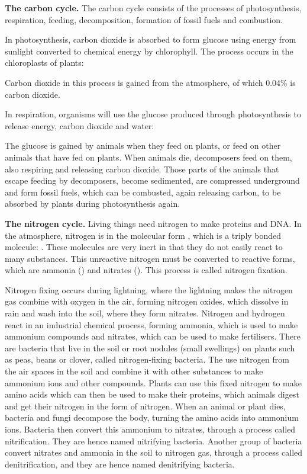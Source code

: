 \textbf{The carbon cycle.} 
The carbon cycle consists of the processes of photosynthesis, respiration, feeding, decomposition,
formation of fossil fuels and combustion.

In photosynthesis, carbon dioxide is absorbed to form glucose using energy from sunlight converted
to chemical energy by chlorophyll. The process occurs in the chloroplasts of plants:

\begin{center}
\end{center}
Carbon dioxide in this process is gained from the atmosphere, of which 0.04\% is carbon dioxide. 

In respiration, organisms will use the glucose produced through photosynthesis to release energy,
carbon dioxide and water:

\begin{center}
\end{center}

The glucose is gained by animals when they feed on plants, or feed on other animals that have fed
on plants. When animals die, decomposers feed on them, also respiring and releasing carbon dioxide.
Those parts of the animals that escape feeding by decomposers, become sedimented, are compressed
underground and form fossil fuels, which can be combusted, again releasing carbon, to be absorbed
by plants during photosynthesis again.

\textbf{The nitrogen cycle.} Living things need nitrogen to make proteins and DNA. In the 
atmosphere, nitrogen is in the molecular form , which is a triply bonded molecule: 
. These molecules are very inert in that they do not easily react to many substances.
This unreactive nitrogen must be converted to reactive forms, which are ammonia () and
nitrates (). This process is called nitrogen fixation.

Nitrogen fixing occurs during lightning, where the lightning makes the nitrogen gas combine with
oxygen in the air, forming nitrogen oxides, which dissolve in rain and wash into the soil, where
they form nitrates. Nitrogen and hydrogen react in an industrial chemical process, forming ammonia,
which is used to make ammonium compounds and nitrates, which can be used to make fertilisers. 
There are bacteria that live in the soil or root nodules (small swellings) on plants such as peas,
beans or clover, called nitrogen-fixing bacteria. The use nitrogen from the air spaces in the
soil and combine it with other substances to make ammonium ions and other compounds. Plants can
use this fixed nitrogen to make amino acids which can then be used to make their proteins, which
animals digest and get their nitrogen in the form of nitrogen. When an animal or plant dies,
bacteria and fungi decompose the body, turning the amino acids into ammonium ions. Bacteria then
convert this ammonium to nitrates, through a process called nitrification. They are hence named
nitrifying bacteria. Another group of bacteria convert nitrates and ammonia in the soil to nitrogen
gas, through a process called denitrification, and they are hence named denitrifying bacteria.

